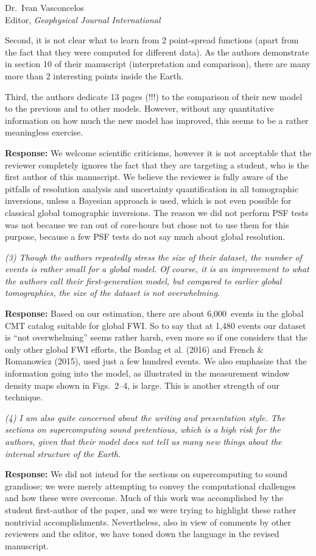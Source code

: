 \documentclass[11pt,a4paper]{letter}
\newcommand{\response}[1]{\textbf{Response:} #1}
\newcommand{\rev}[1]{{\it{#1}}}
\begin{document}
\begin{letter}{Dr.~Ivan Vasconcelos\\
Editor, \textit{Geophysical Journal International}}
{Second, it is not clear what to learn from 2 point-spread functions (apart from the fact that they were computed for different data). As the authors demonstrate in section 10 of their manuscript (interpretation and comparison), there are many more than 2 interesting points inside the Earth.

Third, the authors dedicate 13 pages (!!!) to the comparison of their new model to the previous and to other models. However, without any quantitative information on how much the new model has improved, this seems to be a rather meaningless exercise.
}

\response{We welcome scientific criticisms, however it is not acceptable that the reviewer completely ignores the fact that they are targeting a student,
who is the first author of this manuscript.
We believe the reviewer is fully aware of the pitfalls of resolution analysis and uncertainty quantification in all tomographic inversions, unless a Bayesian approach is used, which is not even possible for classical global tomographic inversions.
The reason we did not perform PSF tests was not because we ran out of core-hours but chose not to use them for this purpose,
because a few PSF tests do not say much about global resolution.
}

\rev{(3) Though the authors repeatedly stress the size of their dataset, the number of events is rather small for a global model. Of course, it is an improvement to what the authors call their first-generation model, but compared to earlier global tomographies, the size of the dataset is not overwhelming.
}

\response{
Based on our estimation, there are about 6,000~events in the global CMT catalog suitable for global FWI.
So to say that at 1,480 events our dataset is ``not overwhelming'' seems rather harsh,
even more so if one considers that the only other global FWI efforts,
the Bozdag et al. (2016) and French \& Romanowicz (2015),
used just a few hundred events.
We also emphasize that the information going into the model,
as illustrated in the measurement window density maps shown in Figs.~2--4, is large.
This is another strength of our technique.
}


\rev{(4) I am also quite concerned about the writing and presentation style. The sections on supercomputing sound pretentious, which is a high risk for the authors, given that their model does not tell us many new things about the internal structure of the Earth. 
}

\response{
We did not intend for the sections on supercomputing to sound grandiose; we were merely attempting to convey the computational challenges and how these were overcome.
Much of this work was accomplished by the student first-author of the paper, and we were trying to highlight these rather nontrivial accomplishments.
Nevertheless, also in view of comments by other reviewers and the editor, we have toned down the language in the revised manuscript.

}
\end{letter}
\end{document}
